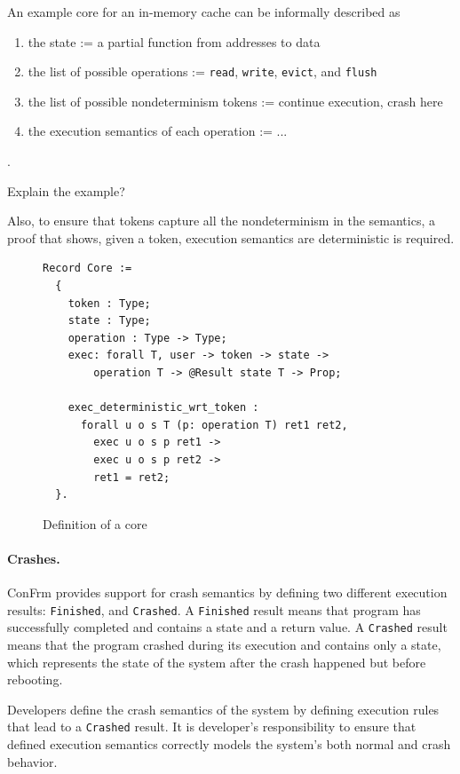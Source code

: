 An example core for an in-memory cache can be informally described as
\begin{enumerate}
    \item the state := a partial function from addresses to data
    \item the list of possible operations := \texttt{read}, \texttt{write}, \texttt{evict}, 
    and \texttt{flush}
    \item the list of possible nondeterminism tokens := continue execution, crash here
    \item the execution semantics of each operation := ...
\end{enumerate}.

{\color{red}Explain the example?}

Also, to ensure that tokens capture all the nondeterminism in the semantics, a proof that shows, given a token, execution semantics are deterministic is required.
  
\begin{figure}[H]
    \centering
    \begin{verbatim}
Record Core :=
  {
    token : Type;
    state : Type;
    operation : Type -> Type;
    exec: forall T, user -> token -> state ->
        operation T -> @Result state T -> Prop;
    
    exec_deterministic_wrt_token :
      forall u o s T (p: operation T) ret1 ret2,
        exec u o s p ret1 ->
        exec u o s p ret2 ->
        ret1 = ret2;
  }.
    \end{verbatim}
    \caption{Definition of a core}
    \label{fig:Core_Definition}
\end{figure}

\paragraph{Crashes.}
ConFrm provides support for crash semantics by defining two different execution results: \texttt{Finished}, and \texttt{Crashed}. A \texttt{Finished} result means that program has successfully completed and contains a state and a return value. A \texttt{Crashed} result means that the program crashed during its execution and contains only a state, which represents the state of the system after the crash happened but before rebooting.

Developers define the crash semantics of the system by defining execution rules that lead to a \texttt{Crashed} result. It is developer's responsibility to ensure that defined execution semantics correctly models the system's both normal and crash behavior.


